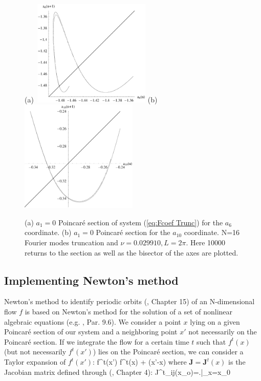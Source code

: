 \documentclass[pre,preprint,groupedaddress,showpacs,showkeys]{revtex4}
\begin{document}
%
 \begin{figure}[t!]
    (a)~\includegraphics[width=2.2in]{figs/poin6-bi.eps}%
    \hspace{0.2cm}%
    (b)~\includegraphics[width=2.2in]{figs/poin10-bi.eps}
    \caption{(a) $a_1=0$ Poincar\'e section of system (\ref{eq:Fcoef Trunc}) for the $a_6$ coordinate.
             (b) $a_1=0$ Poincar\'e section for the $a_{10}$ coordinate.
             N=16 Fourier modes truncation and $\nu=0.029910, L=2\pi$. Here 10000 returns to the section as well as
             the bisector of the axes are plotted.
             }
    \label{fig:guess}
 \end{figure}



 \subsection{Implementing Newton's method \label{sec:NewtonMethod}}

  Newton's method to identify periodic orbits (\cite{DasBuch}, Chapter 15) of an N-dimensional flow $f$
  is based on Newton's method for the solution of a set of nonlinear algebraic equations
  (e.g. \cite{Press:96}, Par. 9.6). We consider a point $x$ lying on a given Poincar\'e section of our system
  and a neighboring point $x'$ not necessarily on the Poincar\'e section. If we integrate
  the flow for a certain time $t$ such that $f^t(x)$ (but not necessarily $f^t(x')$) lies on the Poincar\'e
  section, we can consider a Taylor expansion of $f^t(x')$:
  \beq
    f^t(x') \simeq f^t(x) + (x'-x)
    \label{eq:Taylor of Flow}
  \eeq
  where $\mathbf{J}=\mathbf{J}^t(x)$ is the Jacobian matrix defined through (\cite{DasBuch}, Chapter 4):
  \beq
   J^t_{ij}(x_o)=\left.\right|_{x=x_0}
  \eeq
\end{document}
